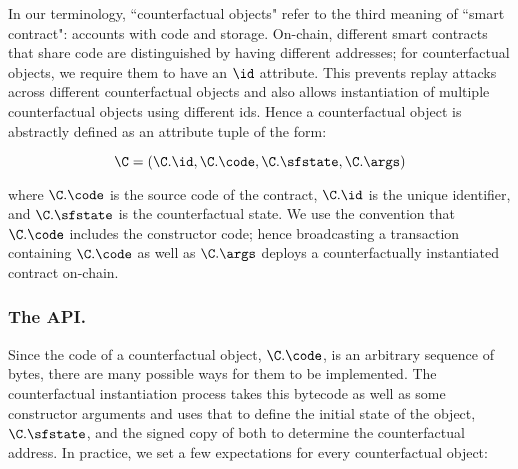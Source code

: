 \documentclass[prb,floatfix,reprint,nofootinbib,amsmath,amssymb,epsfig,pre,floats,letterpaper,groupedaffiliation,tightenlines,allcolors=blue,11pt]{revtex4}
\theoremstyle{definition}
\theoremstyle{definition}
\theoremstyle{definition}
\begin{document}
In our terminology, ``counterfactual objects" refer to the third meaning of ``smart contract": accounts with code and storage. On-chain, different smart contracts that share code are distinguished by having different addresses; for counterfactual objects, we require them to have an $\id$ attribute. This prevents replay attacks across different counterfactual objects and also allows instantiation of multiple counterfactual objects using different ids. Hence a counterfactual object is abstractly defined as an attribute tuple of the form:

    \[ \C = ( \C.\id, \C.\code, \C.\sfstate, \C.\args) \]

where $\C.\code$ is the source code of the contract, $\C.\id$ is the unique identifier, and $\C.\sfstate$ is the counterfactual state. We use the convention that $\C.\code$ includes the constructor code; hence broadcasting a transaction containing $\C.\code$ as well as $\C.\args$ deploys a counterfactually instantiated contract on-chain.

\subsubsection{The API.} Since the code of a counterfactual object, $\C.\code$, is an arbitrary sequence of bytes, there are many possible ways for them to be implemented. The counterfactual instantiation process takes this bytecode as well as some constructor arguments and uses that to define the initial state of the object, $\C.\sfstate$, and the signed copy of both to determine the counterfactual address. In practice, we set a few expectations for every counterfactual object:
\end{document}
